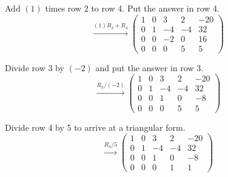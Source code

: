 \begin{example}
Add $(1)$ times row 2 to row 4. Put the answer in row 4.
\[%
        \stackrel{(1)R_2 + R_4}{\longrightarrow}
    \left( \begin{array}{cccc|c} 
        1 & 0 & 3 & 2 & -20 \\
        0 & 1 & -4 & -4 & 32 \\
        0 & 0 & -2 & 0 & 16 \\
        0 & 0 & 0 & 5 & 5 \end{array} \right)    
        \]

Divide row 3 by $(-2)$ and put the answer in row 3.
\[%
        \stackrel{R_3/(-2)}{\longrightarrow}
    \left( \begin{array}{cccc|c} 
        1 & 0 & 3 & 2 & -20 \\
        0 & 1 & -4 & -4 & 32 \\
        0 & 0 & 1 & 0 & -8 \\
        0 & 0 & 0 & 5 & 5 \end{array} \right)    
        \]

Divide row 4 by 5 to arrive at a triangular form.
\[%
        \stackrel{R_4/5}{\longrightarrow}
    \left( \begin{array}{cccc|c} 
        1 & 0 & 3 & 2 & -20 \\
        0 & 1 & -4 & -4 & 32 \\
        0 & 0 & 1 & 0 & -8 \\
        0 & 0 & 0 & 1 & 1 \end{array} \right)    
        \]


\end{example}
